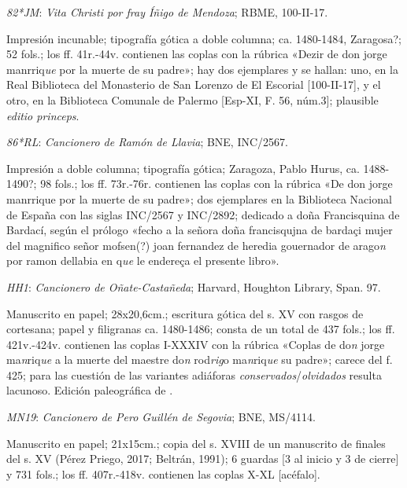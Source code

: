 \documentclass[11pt,a4paper,twoside]{article}
\newcommand{\comillas}[1]{«#1»}
\begin{document}
\textit{82*JM}: \textit{Vita Christi por fray Íñigo de Mendoza}; RBME, 100-II-17.

Impresión incunable; tipografía gótica a doble columna; ca. 1480-1484, Zaragosa?; 52 fols.; los ff. 41r.-44v. contienen las coplas con la rúbrica \comillas{Dezir de don jorge manrriq\textit{ue} por la muerte de su padre}; hay dos ejemplares y se hallan: uno, en la Real Biblioteca del Monasterio de San Lorenzo de El Escorial [100-II-17], y el otro, en la Biblioteca Comunale de Palermo [Esp-XI, F. 56, núm.3]; plausible \textit{editio princeps}.\vspace{5pt}

\textit{86*RL}: \textit{Cancionero de Ramón de Llavia}; BNE, INC/2567.

Impresión a doble columna; tipografía gótica; Zaragoza, Pablo Hurus, ca. 1488-1490?; 98 fols.; los ff. 73r.-76r. contienen las coplas con la rúbrica \comillas{De don jorge manrrique por la muerte de su padre}; dos ejemplares en la Biblioteca Nacional de España con las siglas INC/2567 y INC/2892; dedicado a doña Francisquina de Bardací, según el prólogo \comillas{fecho a la señora doña francisqujna de bardaçi mujer del magnifico señor mofsen(?) joan fernandez de heredia gouernador de arago\textit{n} por ramon dellabia en q\textit{ue} le endereça el presente libro}.\vspace{5pt}

\textit{HH1}: \textit{Cancionero de Oñate-Castañeda}; Harvard, Houghton Library, Span. 97.

Manuscrito en papel; 28x20,6cm.; escritura gótica del s. XV con rasgos de cortesana; papel y filigranas ca. 1480-1486; consta de un total de 437 fols.; los ff. 421v.-424v. contienen las coplas I-XXXIV con la rúbrica \comillas{Coplas de do\textit{n} jorge ma\textit{n}riq\textit{ue} a la muerte del maestre do\textit{n} rod\textit{rig}o ma\textit{n}riq\textit{ue} su padre}; carece del f. 425; para las cuestión de las variantes adiáforas \textit{conservados}/\textit{olvidados} resulta lacunoso. Edición paleográfica de \textcite{Severin1990}.\vspace{5pt} 

\textit{MN19}: \textit{Cancionero de Pero Guillén de Segovia}; BNE, MS/4114.

Manuscrito en papel; 21x15cm.; copia del s. XVIII de un manuscrito de finales del s. XV (Pérez Priego, 2017; Beltrán, 1991); 6 guardas [3 al inicio y 3 de cierre] y 731 fols.; los ff. 407r.-418v. contienen las coplas X-XL [acéfalo].\vspace{5pt}
\end{document}
